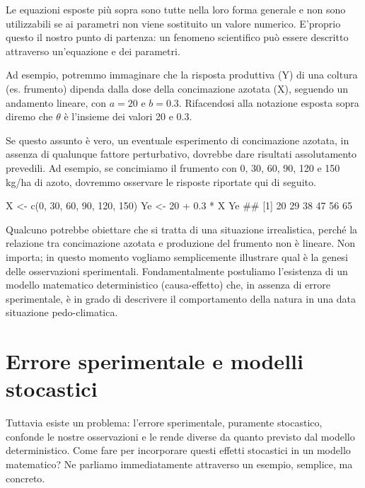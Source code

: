 \documentclass[a4paper,12pt,oneside]{book}
\newenvironment{Shaded}{}{}
\newcommand{\KeywordTok}[1]{#1}
\newcommand{\DecValTok}[1]{#1}
\newcommand{\FloatTok}[1]{#1}
\newcommand{\StringTok}[1]{#1}
\newcommand{\CommentTok}[1]{#1}
\newcommand{\OperatorTok}[1]{#1}
\newcommand{\NormalTok}[1]{#1}
\begin{document}
Le equazioni esposte più sopra sono tutte nella loro forma generale e non sono utilizzabili se ai parametri non viene sostituito un valore numerico. E'proprio questo il nostro punto di partenza: un fenomeno scientifico può essere descritto attraverso un'equazione e dei parametri.

Ad esempio, potremmo immaginare che la risposta produttiva (Y) di una coltura (es. frumento) dipenda dalla dose della concimazione azotata (X), seguendo un andamento lineare, con \(a = 20\) e \(b = 0.3\). Rifacendosi alla notazione esposta sopra diremo che \(\theta\) è l'insieme dei valori 20 e 0.3.

Se questo assunto è vero, un eventuale esperimento di concimazione azotata, in assenza di qualunque fattore perturbativo, dovrebbe dare risultati assolutamento prevedili. Ad esempio, se concimiamo il frumento con 0, 30, 60, 90, 120 e 150 kg/ha di azoto, dovremmo osservare le risposte riportate qui di seguito.

\begin{Shaded}
\begin{Highlighting}[]
\NormalTok{X <-}\StringTok{ }\KeywordTok{c}\NormalTok{(}\DecValTok{0}\NormalTok{, }\DecValTok{30}\NormalTok{, }\DecValTok{60}\NormalTok{, }\DecValTok{90}\NormalTok{, }\DecValTok{120}\NormalTok{, }\DecValTok{150}\NormalTok{)}
\NormalTok{Ye <-}\StringTok{ }\DecValTok{20} \OperatorTok{+}\StringTok{ }\FloatTok{0.3} \OperatorTok{*}\StringTok{ }\NormalTok{X}
\NormalTok{Ye}
\CommentTok{## [1] 20 29 38 47 56 65}
\end{Highlighting}
\end{Shaded}

Qualcuno potrebbe obiettare che si tratta di una situazione irrealistica, perché la relazione tra concimazione azotata e produzione del frumento non è lineare. Non importa; in questo momento vogliamo semplicemente illustrare qual è la genesi delle osservazioni sperimentali. Fondamentalmente postuliamo l'esistenza di un modello matematico deterministico (causa-effetto) che, in assenza di errore sperimentale, è in grado di descrivere il comportamento della natura in una data situazione pedo-climatica.

\hypertarget{errore-sperimentale-e-modelli-stocastici}{%
\section{Errore sperimentale e modelli stocastici}\label{errore-sperimentale-e-modelli-stocastici}}

Tuttavia esiste un problema: l'errore sperimentale, puramente stocastico, confonde le nostre osservazioni e le rende diverse da quanto previsto dal modello deterministico. Come fare per incorporare questi effetti stocastici in un modello matematico? Ne parliamo immediatamente attraverso un esempio, semplice, ma concreto.
\end{document}
